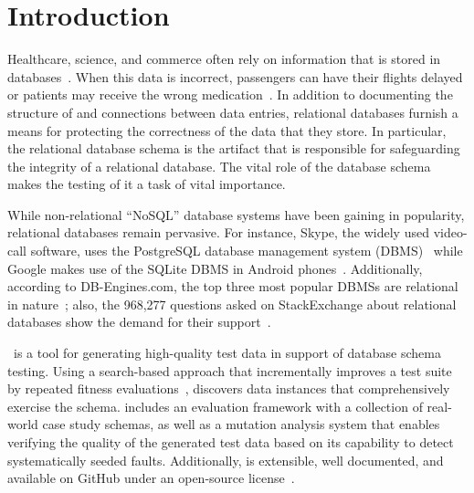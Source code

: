 \section{Introduction}\label{sec:intro}


Healthcare, science, and commerce often rely on information that is stored in
databases~\cite{kapfhammer2007comprehensive}.  When this data is incorrect, passengers can have their flights delayed or
patients may receive the wrong medication~\cite{databasebook}.  In addition to documenting the structure of and
connections between data entries, relational databases furnish a means for protecting the correctness of the data that
they store.  In particular, the relational database schema is the artifact that is responsible for safeguarding the
integrity of a relational database. The vital role of the database schema makes the testing of it a task of vital
importance.


While non-relational ``NoSQL'' database systems have been gaining in popularity, relational databases remain pervasive.
For instance, Skype, the widely used video-call software, uses the PostgreSQL database management system
(DBMS)~\cite{postgres} while Google makes use of the SQLite DBMS in Android phones~\cite{sqlite}.  Additionally,
according to DB-Engines.com, the top three most popular DBMSs are relational in nature~\cite{dbrank}; also, the 968,277
questions asked on StackExchange about relational databases show the demand for their support~\cite{stackexchange}.



\sa~is a tool for generating high-quality test data in support of database schema testing. Using a search-based approach
that incrementally improves a test suite by repeated fitness evaluations~\cite{Korel:AVM}, {\sa} discovers data instances
that comprehensively exercise the schema.  {\sa} includes an evaluation framework with a collection of real-world case
study schemas, as well as a mutation analysis system that enables verifying the quality of the generated test data based
on its capability to detect systematically seeded faults.  Additionally, {\sa} is extensible, well documented, and
available on GitHub under an open-source license~\cite{tool}.

